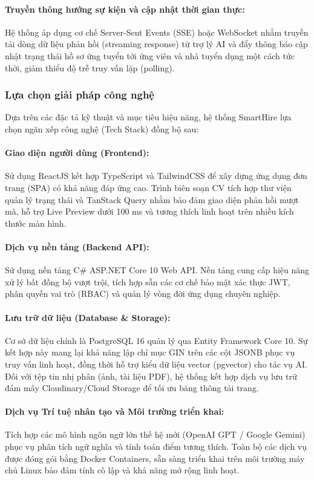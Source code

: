 \paragraph{Truyền thông hướng sự kiện và cập nhật thời gian thực:}
Hệ thống áp dụng cơ chế Server-Sent Events (SSE) hoặc WebSocket nhằm truyền tải dòng dữ liệu phản hồi (streaming response) từ trợ lý AI và đẩy thông báo cập nhật trạng thái hồ sơ ứng tuyển tới ứng viên và nhà tuyển dụng một cách tức thời, giảm thiểu độ trễ truy vấn lặp (polling).

\subsubsection{Lựa chọn giải pháp công nghệ}
Dựa trên các đặc tả kỹ thuật và mục tiêu hiệu năng, hệ thống SmartHire lựa chọn ngăn xếp công nghệ (Tech Stack) đồng bộ sau:

\paragraph{Giao diện người dùng (Frontend):}
Sử dụng ReactJS kết hợp TypeScript và TailwindCSS để xây dựng ứng dụng đơn trang (SPA) có khả năng đáp ứng cao. Trình biên soạn CV tích hợp thư viện quản lý trạng thái và TanStack Query nhằm bảo đảm giao diện phản hồi mượt mà, hỗ trợ Live Preview dưới 100 ms và tương thích linh hoạt trên nhiều kích thước màn hình.

\paragraph{Dịch vụ nền tảng (Backend API):}
Sử dụng nền tảng C\# ASP.NET Core 10 Web API. Nền tảng cung cấp hiệu năng xử lý bất đồng bộ vượt trội, tích hợp sẵn các cơ chế bảo mật xác thực JWT, phân quyền vai trò (RBAC) và quản lý vòng đời ứng dụng chuyên nghiệp.

\paragraph{Lưu trữ dữ liệu (Database \& Storage):}
Cơ sở dữ liệu chính là PostgreSQL 16 quản lý qua Entity Framework Core 10. Sự kết hợp này mang lại khả năng lập chỉ mục GIN trên các cột JSONB phục vụ truy vấn linh hoạt, đồng thời hỗ trợ kiểu dữ liệu vector (pgvector) cho tác vụ AI. Đối với tệp tin nhị phân (ảnh, tài liệu PDF), hệ thống kết hợp dịch vụ lưu trữ đám mây Cloudinary/Cloud Storage để tối ưu băng thông tải trang.

\paragraph{Dịch vụ Trí tuệ nhân tạo và Môi trường triển khai:}
Tích hợp các mô hình ngôn ngữ lớn thế hệ mới (OpenAI GPT / Google Gemini) phục vụ phân tích ngữ nghĩa và tính toán điểm tương thích. Toàn bộ các dịch vụ được đóng gói bằng Docker Containers, sẵn sàng triển khai trên môi trường máy chủ Linux bảo đảm tính cô lập và khả năng mở rộng linh hoạt.